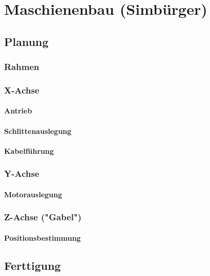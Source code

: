 \section{Maschienenbau (Simbürger)}

\subsection{Planung}

\subsubsection{Rahmen}

\subsubsection{X-Achse}

\paragraph{Antrieb}

\paragraph{Schlittenauslegung}

\paragraph{Kabelführung}

\subsubsection{Y-Achse}
\paragraph{Motorauslegung}

\subsubsection{Z-Achse ("Gabel")}
\paragraph{Positionsbestimmung}

\subsection{Ferttigung}

